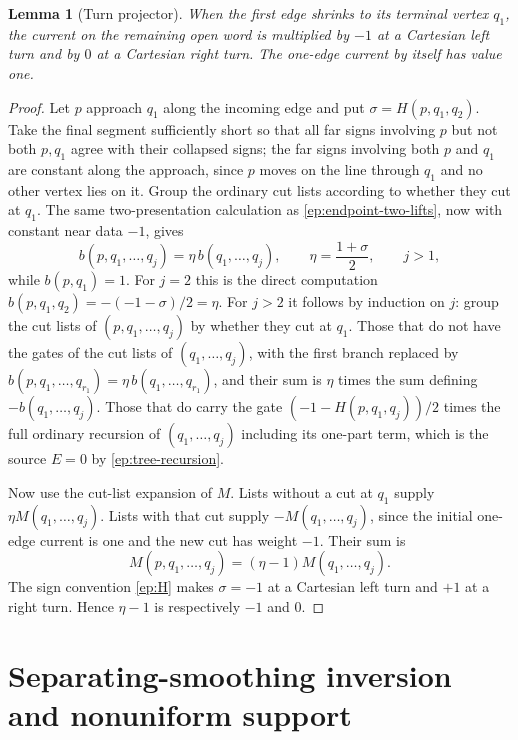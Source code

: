\documentclass[11pt,letterpaper]{article}
\numberwithin{equation}{section}
\newtheorem{lemma}[theorem]{Lemma}
\theoremstyle{definition}
\theoremstyle{remark}
\begin{document}
\begin{lemma}[Turn projector]
\label{ep:turn}
When the first edge shrinks to its terminal vertex $q_1$, the current on
the remaining open word is multiplied by $-1$ at a Cartesian left turn
and by $0$ at a Cartesian right turn.  The one-edge current by itself has
value one.
\end{lemma}
\begin{proof}
Let $p$ approach $q_1$ along the incoming edge and put
$\sigma=H(p,q_1,q_2)$.  Take the final segment sufficiently short so that
all far signs involving $p$ but not both $p,q_1$ agree with their collapsed
signs; the far signs involving both $p$ and $q_1$ are constant along the
approach, since $p$ moves on the line through $q_1$ and no other vertex
lies on it.  Group the ordinary cut lists according to whether they cut at
$q_1$.  The same two-presentation calculation as
\eqref{ep:endpoint-two-lifts}, now with constant near data $-1$, gives
\begin{equation}
 b(p,q_1,\ldots,q_j)=\eta\,b(q_1,\ldots,q_j),\qquad
 \eta=\frac{1+\sigma}{2},\qquad j>1,
 \label{ep:short-first-current}
\end{equation}
while $b(p,q_1)=1$.  For $j=2$ this is the direct computation
$b(p,q_1,q_2)=-(-1-\sigma)/2=\eta$.  For $j>2$ it follows by induction on
$j$: group the cut lists of $(p,q_1,\ldots,q_j)$ by whether they cut at
$q_1$.  Those that do not have the gates of the cut lists of
$(q_1,\ldots,q_j)$, with the first branch replaced by
$b(p,q_1,\ldots,q_{r_1})=\eta\,b(q_1,\ldots,q_{r_1})$, and their sum is
$\eta$ times the sum defining $-b(q_1,\ldots,q_j)$.  Those that do carry
the gate $(-1-H(p,q_1,q_j))/2$ times the full ordinary recursion of
$(q_1,\ldots,q_j)$ including its one-part term, which is the source
$E=0$ by \eqref{ep:tree-recursion}.

Now use the cut-list expansion of $M$.  Lists without a cut at $q_1$
supply $\eta M(q_1,\ldots,q_j)$.  Lists with that cut supply
$-M(q_1,\ldots,q_j)$, since the initial one-edge current is one and the
new cut has weight $-1$.  Their sum is
\begin{equation}
 M(p,q_1,\ldots,q_j)
 =(\eta-1)M(q_1,\ldots,q_j).
 \label{ep:turn-formula}
\end{equation}
The sign convention \eqref{ep:H} makes $\sigma=-1$ at a Cartesian left
turn and $+1$ at a right turn.  Hence $\eta-1$ is respectively $-1$ and
$0$.
\end{proof}

\section{Separating-smoothing inversion and nonuniform support}
\label{sec:primitive}
\end{document}

